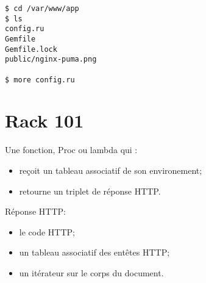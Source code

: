 \begin{otherlanguage}{english}

\begin{verbatim}
$ cd /var/www/app
$ ls
config.ru
Gemfile
Gemfile.lock
public/nginx-puma.png

$ more config.ru
\end{verbatim}

\end{otherlanguage}

\hypertarget{rack-101}{%
\section{Rack 101}\label{rack-101}}

\begin{otherlanguage}{english}

\begin{Shaded}
\begin{Highlighting}[]
\NormalTok{  [}
    \NormalTok{,}
\NormalTok{    \{}\NormalTok{ => }\NormalTok{\},}
\NormalTok{    [}
      \NormalTok{,}
      \NormalTok{,}
      \NormalTok{,}
      \NormalTok{,}
\NormalTok{    ]}
\NormalTok{  ]}
\end{Highlighting}
\end{Shaded}

\end{otherlanguage}

Une fonction, Proc ou lambda qui :

\begin{itemize}
\tightlist
\item
  reçoit un tableau associatif de son environement;
\item
  retourne un triplet de réponse HTTP.
\end{itemize}

Réponse HTTP:

\begin{itemize}
\tightlist
\item
  le code HTTP;
\item
  un tableau associatif des entêtes HTTP;
\item
  un itérateur sur le corps du document.
\end{itemize}

